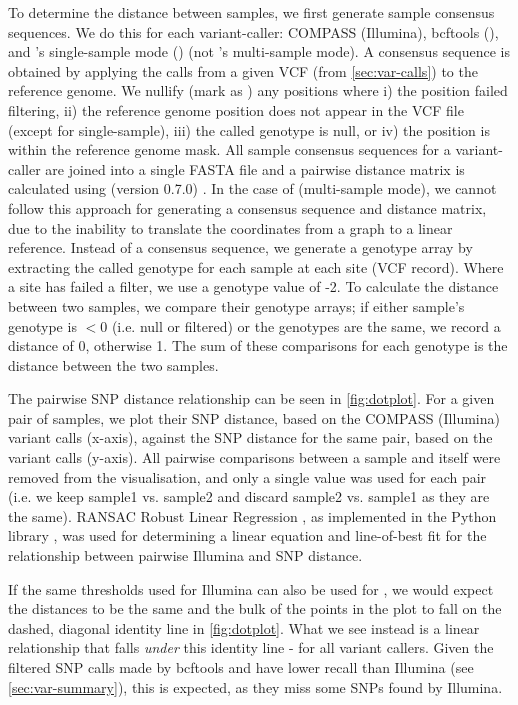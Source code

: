 To determine the distance between samples, we first generate sample consensus sequences. We do this for each variant-caller: COMPASS (Illumina), bcftools (\ont{}), and \pandora{}'s single-sample mode (\ont{}) (not \pandora{}'s multi-sample mode). A consensus sequence is obtained by applying the calls from a given VCF (from \autoref{sec:var-calls}) to the \mtb{} reference genome. We nullify (mark as ) any positions where i) the position failed filtering, ii) the reference genome position does not appear in the VCF file (except for \pandora{} single-sample), iii) the called genotype is null, or iv) the position is within the reference genome mask. All sample consensus sequences for a variant-caller are joined into a single FASTA file and a pairwise distance matrix is calculated using  (version 0.7.0) \cite{snp-dists}. In the case of \pandora{}  (multi-sample mode), we cannot follow this approach for generating a consensus sequence and distance matrix, due to the inability to translate the coordinates from a graph to a linear reference. Instead of a consensus sequence, we generate a genotype array by extracting the called genotype for each sample at each site (VCF record). Where a site has failed a filter, we use a genotype value of -2. To calculate the distance between two samples, we compare their genotype arrays; if either sample's genotype is $<0$ (i.e. null or filtered) or the genotypes are the same, we record a distance of 0, otherwise 1. The sum of these comparisons for each genotype is the distance between the two samples.

The pairwise SNP distance relationship can be seen in \autoref{fig:dotplot}. For a given pair of samples, we plot their SNP distance, based on the COMPASS (Illumina) variant calls (x-axis), against the SNP distance for the same pair, based on the \ont{} variant calls (y-axis). All pairwise comparisons between a sample and itself were removed from the visualisation, and only a single value was used for each pair (i.e. we keep sample1 vs. sample2 and discard sample2 vs. sample1 as they are the same). RANSAC Robust Linear Regression \cite{fischler1981}, as implemented in the Python library  \cite{scikitlearn}, was used for determining a linear equation and line-of-best fit for the relationship between pairwise Illumina and \ont{} SNP distance.

If the same thresholds used for Illumina can also be used for \ont{}, we would expect the distances to be the same and the bulk of the points in the plot to fall on the dashed, diagonal identity line in \autoref{fig:dotplot}. What we see instead is a linear relationship that falls \emph{under} this identity line - for all \ont{} variant callers. Given the filtered \ont{} SNP calls made by bcftools and \pandora{} have lower recall than Illumina (see \autoref{sec:var-summary}), this is expected, as they miss some SNPs found by Illumina.

